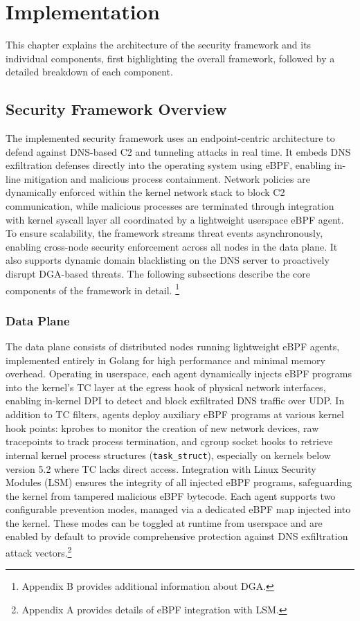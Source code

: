 \documentclass [11pt, proquest] {uwthesis}[2020/02/24]
\begin{document}
\chapter{Implementation}
This chapter explains the architecture of the security framework and its individual components, first highlighting the overall framework, followed by a detailed breakdown of each component.
\section{Security Framework Overview}
The implemented security framework uses an endpoint-centric architecture to defend against DNS-based C2 and tunneling attacks in real time. It embeds DNS exfiltration defenses directly into the operating system using eBPF, enabling in-line mitigation and malicious process containment. Network policies are dynamically enforced within the kernel network stack to block C2 communication, while malicious processes are terminated through integration with kernel syscall layer all coordinated by a lightweight userspace eBPF agent. To ensure scalability, the framework streams threat events asynchronously, enabling cross-node security enforcement across all nodes in the data plane. It also supports dynamic domain blacklisting on the DNS server to proactively disrupt DGA-based threats. The following subsections describe the core components of the framework in detail. \footnote{Appendix B provides additional information about DGA.}


\subsection{Data Plane}
The data plane consists of distributed nodes running lightweight eBPF agents, implemented entirely in Golang for high performance and minimal memory overhead. Operating in userspace, each agent dynamically injects eBPF programs into the kernel’s TC layer at the egress hook of physical network interfaces, enabling in-kernel DPI to detect and block exfiltrated DNS traffic over UDP. In addition to TC filters, agents deploy auxiliary eBPF programs at various kernel hook points: kprobes to monitor the creation of new network devices, raw tracepoints to track process termination, and cgroup socket hooks to retrieve internal kernel process structures (\texttt{task\_struct}), especially on kernels below version 5.2 where TC lacks direct access. Integration with Linux Security Modules (LSM) ensures the integrity of all injected eBPF programs, safeguarding the kernel from tampered malicious eBPF bytecode. Each agent supports two configurable prevention modes, managed via a dedicated eBPF map injected into the kernel. These modes can be toggled at runtime from userspace and are enabled by default to provide comprehensive protection against DNS exfiltration attack vectors.\footnote{Appendix A provides details of eBPF integration with LSM.}
\end{document}
